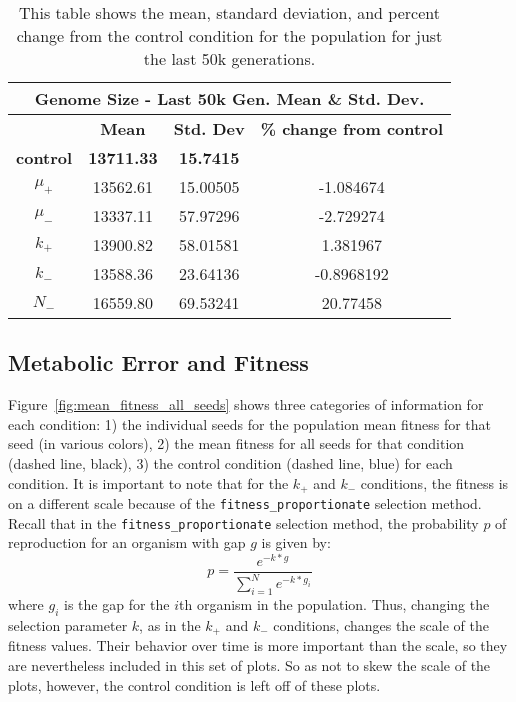 \begin{table}[H]
	\begin{tabular}{|c|c|c|c|}
		\hline
		\multicolumn{4}{c}{\textbf{Genome Size - Last 50k Gen. Mean \& Std. Dev.}} \\
		\hline
		& \textbf{Mean} & \textbf{Std. Dev} & \textbf{\% change from control} \\
		\hline		
		\textbf{control} & \textbf{13711.33} & \textbf{15.7415} & \textemdash \\ 
		\hline
		$\mu_+$ & 13562.61 & 15.00505 & -1.084674 \\ 
		\hline
		$\mu_-$ & 13337.11 & 57.97296 & -2.729274\\ 
		\hline
		$k_+$ & 13900.82 & 58.01581 & 1.381967 \\ 
		\hline
		$k_-$ & 13588.36 & 23.64136 & -0.8968192 \\ 
		\hline
		$N_-$ & 16559.80 & 69.53241 & 20.77458 \\ 
		\hline
	\end{tabular}
	\caption[Genome size - last 50k generations mean \& std. dev.]{This table shows the mean, standard deviation, and percent change from the control condition for the population for just the last 50k generations.}
	\label{table:genome_size_stats_last_50k}
\end{table}


\subsection{Metabolic Error and Fitness}
Figure~\ref{fig:mean_fitness_all_seeds} shows three categories of information for each condition: 1) the individual seeds for the population mean fitness for that seed (in various colors), 2) the mean fitness for all seeds for that condition (dashed line, black), 3) the control condition (dashed line, blue) for each condition. It is important to note that for the $k_+$ and $k_-$ conditions, the fitness is on a different scale because of the \texttt{fitness\_proportionate} selection method. Recall that in the \texttt{fitness\_proportionate} selection method, the probability $p$ of reproduction for an organism with gap $g$ is given by:
\begin{equation*}
p = \frac{e^{-k*g}}{\sum_{i=1}^{N}e^{-k*g_i}}
\end{equation*}
where $g_i$ is the gap for the $i$th organism in the population. Thus, changing the selection parameter $k$, as in the $k_+$ and $k_-$ conditions, changes the scale of the fitness values. Their behavior over time is more important than the scale, so they are nevertheless included in this set of plots. So as not to skew the scale of the plots, however, the control condition is left off of these plots. 

